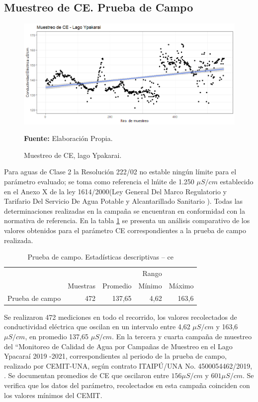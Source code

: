 \subsection{Muestreo de CE. Prueba de Campo}

\begin{figure}[H]
        \centering
        \includegraphics[width=0.75\linewidth]{Imagenes/cap4/CE_lago.png}
        \caption {Muestreo de CE, lago Ypakarai. }{\textbf{Fuente:}
        Elaboraci\'on Propia. }
        \label{fig:Lago_ce}
\end{figure}

Para aguas de Clase 2 la Resoluci\'on 222/02 no estable ningún l\'imite para el par\'ametro evaluado; se toma como referencia el l\'mite de 1.250 $\mu S/cm$ establecido en el Anexo X de la ley 1614/2000(Ley General Del Marco Regulatorio y Tarifario Del Servicio De Agua Potable y Alcantarillado Sanitario \cite{ministerio_de_hacienda_ley_nodate}). Todas las determinaciones realizadas en la campa\~na se encuentran en conformidad con la normativa de referencia.
En la tabla \ref{table:Lago_ce} se presenta un an\'alisis comparativo de los valores obtenidos para el par\'ametro CE correspondientes a la prueba de campo  realizada.

\begin{table}[H]
\centering
\caption{Prueba de campo. Estadísticas descriptivas – ce}
\label{table:Lago_ce}
\begin{tabular}{lrrrr}
\toprule& 
\multicolumn{3}{r}{Rango} \\  \cline{4-5}& 
Muestras & Promedio & Mínimo & Máximo \\
\midrule
Prueba de campo  &      472 &   137,65 &   4,62 &  163,6 \\
\bottomrule
\end{tabular}
\end{table}

Se realizaron 472 mediciones en todo el recorrido, los valores recolectados de conductividad el\'ectrica que oscilan en  un intervalo entre 4,62 $\mu S/cm$ y 163,6 $\mu S/cm$, en promedio 137,65 $\mu S/cm$.
En la tercera y cuarta campaña de muestreo del “Monitoreo de Calidad de Agua por Campañas de Muestreo en el Lago Ypacaraí 2019 -2021, correspondientes al periodo de la prueba de campo, realizado por CEMIT-UNA, seg\'un contrato ITAIPÚ/UNA No. 4500054462/2019, \cite{3er_Cemit}\cite{4to_Cemit}. Se documentan promedios de CE que oscilaron entre $156 \mu S/cm$ y $601 \mu S/cm$. 
Se verifica que los datos del par\'ametro, recolectados en esta campa\~na coinciden con los valores mínimos del CEMIT.

